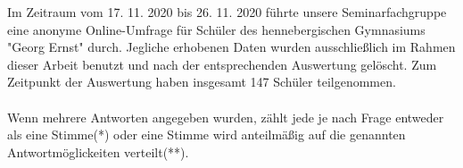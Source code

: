 \documentclass[a4paper, 12pt]{scrartcl}
\begin{document}
        \newpage
        
        
        
    
        \newpage
        
    \listoffigures
        \newpage
        
        
        
        
        
\label{sec:abkuerzungsverzeichnis}

\begin{acronym}[XXXXX]
\end{acronym}
\newpage

    
        \newpage
    
    
    
    
    
    
\normalsize
Im Zeitraum vom 17. 11. 2020 bis 26. 11. 2020 führte unsere Seminarfachgruppe eine anonyme Online-Umfrage für Schüler des hennebergischen Gymnasiums "Georg Ernst" durch. Jegliche erhobenen Daten wurden ausschließlich im Rahmen dieser Arbeit benutzt und nach der entsprechenden Auswertung gelöscht. Zum Zeitpunkt der Auswertung haben insgesamt 147 Schüler teilgenommen.\\\\
Wenn mehrere Antworten angegeben wurden, zählt jede je nach Frage entweder als eine Stimme(*) oder eine Stimme wird anteilmäßig auf die genannten Antwortmöglickeiten verteilt(**).\\\\\\\\\\\\\\\\
\end{document}
